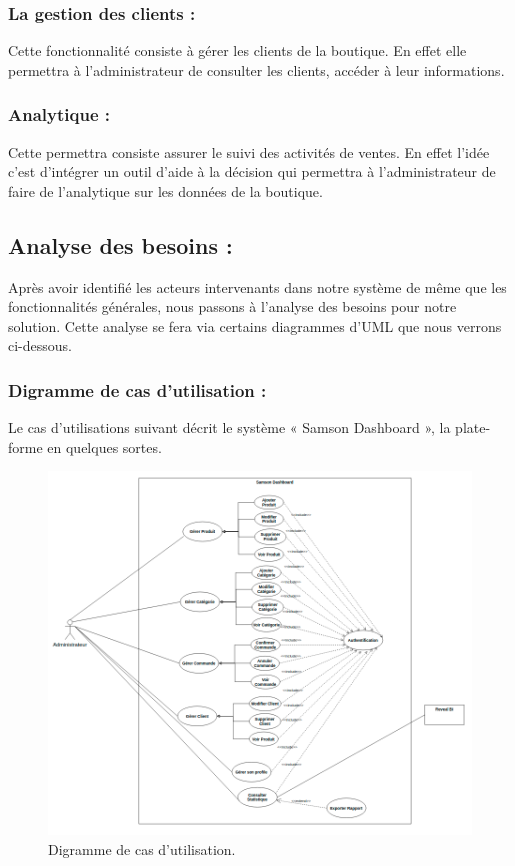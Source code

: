 \documentclass[a4paper, 12pt]{report}
\begin{document}
\subsubsection{La gestion des clients :}
Cette fonctionnalité consiste à gérer les clients de la boutique. En effet elle permettra à l'administrateur de consulter les clients, accéder à leur informations.
\subsubsection{Analytique :}
Cette permettra consiste assurer le suivi des activités de ventes. En effet l'idée c'est d'intégrer un outil d'aide à la décision qui permettra à l'administrateur de faire de l'analytique sur les données de la boutique.
\subsection{Analyse des besoins :}
Après avoir identifié les acteurs intervenants dans notre système de même que les
fonctionnalités générales, nous passons à l’analyse des besoins pour notre solution. Cette
analyse se fera via certains diagrammes d’UML que nous verrons ci-dessous.
\subsubsection{Digramme de cas d'utilisation :}
Le cas d’utilisations suivant décrit le système « Samson Dashboard », la
plate-forme en quelques sortes.
\begin{figure}[H]
    \centering
    \includegraphics[width = 1\linewidth]{img/samson_usecase.png}
    \caption{Digramme de cas d'utilisation.}
\end{figure}
\end{document}
